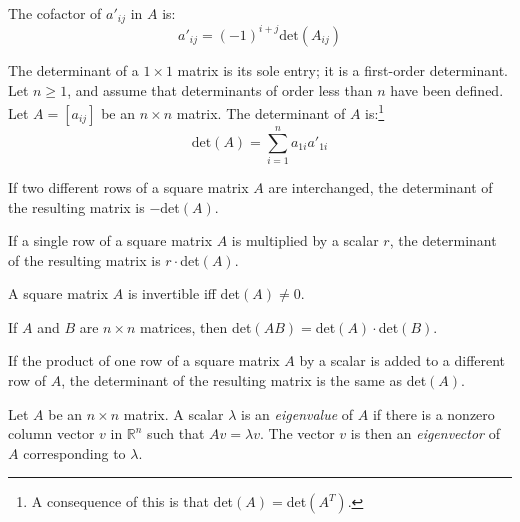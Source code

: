 \documentclass[nobib,notoc]{tufte-handout}
\begin{document}
\begin{defi}[Cofactor]
	The cofactor of \(a'_{ij}\) in \(A\) is:
	\begin{equation*}
		a'_{ij}=(-1)^{i+j}\text{det}(A_{ij})
	\end{equation*}
\end{defi}
\begin{cor}
	The determinant of a \(1\times 1\) matrix is its sole entry; it is a first-order determinant. Let \(n\geq 1\), and assume that determinants of order less than \(n\) have been defined. Let \(A=[a_{ij}]\) be an \(n\times n\) matrix. The determinant of \(A\) is:\footnote{A consequence of this is that det\((A)=\)det\((A^T)\).}
	\begin{equation*}
		\text{det}(A)=\sum_{i=1}^{n}a_{1i}a'_{1i}
	\end{equation*}
\end{cor}
\begin{defi}
	If two different rows of a square matrix \(A\) are interchanged, the determinant of the resulting matrix is \(-\)det\((A)\).
\end{defi}
\begin{defi}
	If a single row of a square matrix \(A\) is multiplied by a scalar \(r\), the determinant of the resulting matrix is \(r\cdot\)det\((A)\).
\end{defi}
\begin{thm}
	A square matrix \(A\) is invertible iff det\((A)\neq 0\).
\end{thm}
\begin{defi}
	If \(A\) and \(B\) are \(n\times n\) matrices, then det\((AB)=\)det\((A)\cdot\)det\((B)\).
\end{defi}
\begin{defi}
	If the product of one row of a square matrix \(A\) by a scalar is added to a different row of \(A\), the determinant of the resulting matrix is the same as det\((A)\).
\end{defi}
\begin{defi}
	Let \(A\) be an \(n\times n\) matrix. A scalar \(\lambda\) is an \emph{eigenvalue} of \(A\) if there is a nonzero column vector \(v\) in \(\mathbb{R}^n\) such that \(Av=\lambda v\). The vector \(v\) is then an \emph{eigenvector} of \(A\) corresponding to \(\lambda\).
\end{defi}
\end{document}
